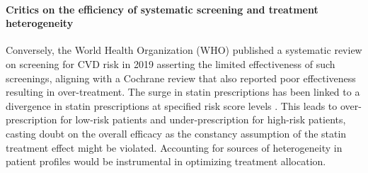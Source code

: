 \documentclass[10pt,letterpaper]{article}
\begin{document}

\paragraph{Critics on the efficiency of systematic screening and treatment heterogeneity}
Conversely, the World Health Organization (WHO) published a systematic review on screening for CVD risk in 2019 \cite{eriksen2021effectiveness} asserting the limited effectiveness of such screenings, aligning with a Cochrane review that also reported poor effectiveness \cite{krogsboll2012general} resulting in over-treatment. The surge in statin prescriptions has been linked to a divergence in statin prescriptions at specified risk score levels \cite{van2013efficiency}. This leads to over-prescription for low-risk patients and under-prescription for high-risk patients, casting doubt on the overall efficacy as the constancy assumption of the statin treatment effect might be violated. Accounting for sources of heterogeneity in patient profiles would be instrumental in optimizing treatment allocation.
\end{document}
